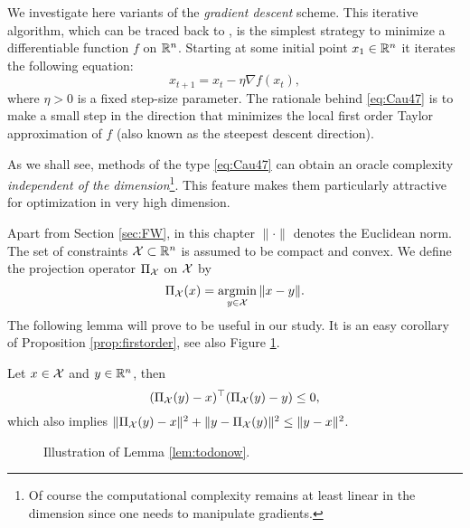 We investigate here variants of the {\em gradient descent} scheme. This iterative algorithm, which can be traced back to \cite{Cau47}, is the simplest strategy to minimize a differentiable function $f$ on $\mathbb{R}^n$. Starting at some initial point $x_1 \in \mathbb{R}^n$ it iterates the following equation:
\begin{equation} \label{eq:Cau47}
x_{t+1} = x_t - \eta \nabla f(x_t) ,
\end{equation}
where $\eta > 0$ is a fixed step-size parameter. The rationale behind \eqref{eq:Cau47} is to make a small step in the direction that minimizes the local first order Taylor approximation of $f$ (also known as the steepest descent direction). 

As we shall see, methods of the type \eqref{eq:Cau47} can obtain an oracle complexity {\em independent of the dimension}\footnote{Of course the computational complexity remains at least linear in the dimension since one needs to manipulate gradients.}. This feature makes them particularly attractive for optimization in very high dimension.

Apart from Section \ref{sec:FW}, in this chapter $\|\cdot\|$ denotes the Euclidean norm. The set of constraints $\mathcal{X} \subset \mathbb{R}^n$ is assumed to be compact and convex. 
We define the projection operator $\Pi_{\mathcal{X}}$ on $\mathcal{X}$ by
$$\Pi_{\mathcal{X}}(x) = \mathop{\mathrm{argmin}}_{y \in \mathcal{X}} \|x - y\| .$$
The following lemma will prove to be useful in our study. It is an easy corollary of Proposition \ref{prop:firstorder}, see also Figure \ref{fig:pythagore}.

\begin{lemma} \label{lem:todonow}
Let $x \in \mathcal{X}$ and $y \in \mathbb{R}^n$, then
$$(\Pi_{\mathcal{X}}(y) - x)^{\top} (\Pi_{\mathcal{X}}(y) - y) \leq 0 ,$$
which also implies $\|\Pi_{\mathcal{X}}(y) - x\|^2 + \|y - \Pi_{\mathcal{X}}(y)\|^2 \leq \|y - x\|^2$.
\end{lemma}

\begin{figure}
\begin{center}
\end{center}
\caption{Illustration of Lemma \ref{lem:todonow}.}
\label{fig:pythagore}
\end{figure}

